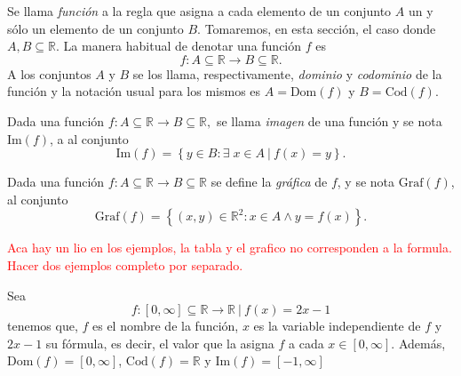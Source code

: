 \begin{definition}
   Se llama \textit{función} a la regla que asigna a cada elemento de un conjunto
    $A$  un y s\'olo un elemento de un conjunto $B$. Tomaremos, en esta secci\'on,  el caso  donde $A, B \subseteq \mathbb{R}.$   La manera habitual de denotar una funci\'on $f$ es $$f: A \subseteq \mathbb{R} \rightarrow B \subseteq \mathbb{R}.$$  A los conjuntos $A$ y $B$  se los llama, respectivamente, \textit{dominio}  y \textit{codominio} de la funci\'on y  la notaci\'on usual para los mismos  es  $A=\text{Dom}(f)$ y $B=\text{Cod}(f)$.
\end{definition}


\begin{definition} Dada una funci\'on $f: A \subseteq \mathbb{R} \rightarrow B \subseteq \mathbb{R},$  se llama \textit{imagen} de una función y se nota  $\text{Im}(f)$, a
    al conjunto 
    \begin{equation*}
        \text{Im}(f) = \left\{ y\in B: \exists\;x\in A\:|\:f(x)=y \right\}.    
    \end{equation*}
\end{definition}

\begin{definition}\label{grafm1}
   Dada una función $f: A \subseteq \mathbb{R} \rightarrow B \subseteq \mathbb{R}$ se define la \textit{gráfica} de $f$, y se nota  $\text{Graf}(f)$, al conjunto
    \begin{equation*}
        \text{Graf}(f) = \left\{ (x,y)\in \mathbb{R}^{2}: x \in A \land y=f(x)\right\}.    
    \end{equation*}
\end{definition}


\textcolor{red}{Aca hay un lio en los ejemplos, la tabla y el grafico no corresponden a la formula. Hacer dos ejemplos completo por separado. }


\begin{example}
   Sea $$f:  [0,\infty]  \subseteq \mathbb{R} \rightarrow  \mathbb{R} \:|\:  f(x)=2x-1$$ tenemos que, $f$ es el nombre de la función, $x$ es la variable independiente de $f$  y $2x-1$ su  fórmula, es decir,  el valor que la asigna $f$ a cada $x \in  [0,\infty]. $ Adem\'as,   $\text{Dom}(f)=  [0,\infty]$,   $\text{Cod}(f)=  \mathbb{R}$ y $\text{Im}(f)= [-1,\infty]$ 
 \end{example}



